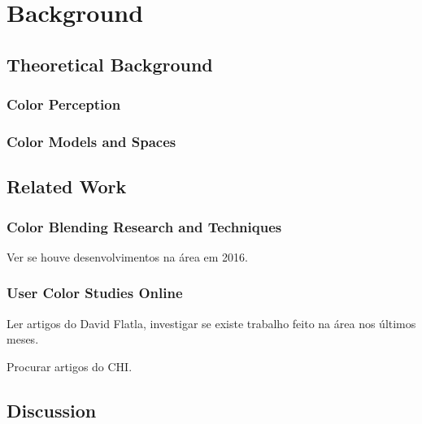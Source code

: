 
\chapter{Background}
\label{chapter:background}

\section{Theoretical Background}
\label{sec:theory_background}

\subsection{Color Perception}
\label{subsec:colorperception}

\subsection{Color Models and Spaces}
\label{subsec:colormodelspaces}

\section{Related Work}
\label{sec:related_work}

\subsection{Color Blending Research and Techniques}
\label{subsec:colorblending}
%
Ver se houve desenvolvimentos na área em 2016. \par
%
\subsection{User Color Studies Online}
\label{subsec:colorstudies}
%
Ler artigos do David Flatla, investigar se existe trabalho feito na área nos últimos meses. \par
Procurar artigos do CHI.
%
\section{Discussion}
\label{sec:background_discussion}
